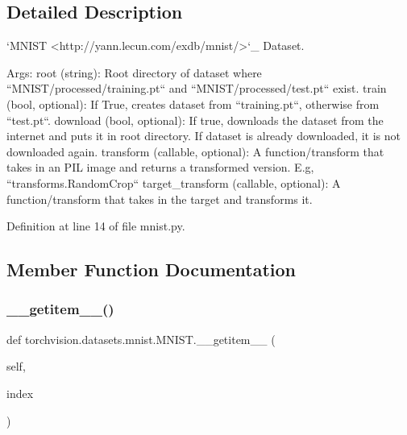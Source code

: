 \subsection{Detailed Description}
\begin{DoxyVerb}`MNIST <http://yann.lecun.com/exdb/mnist/>`_ Dataset.

Args:
    root (string): Root directory of dataset where ``MNIST/processed/training.pt``
        and  ``MNIST/processed/test.pt`` exist.
    train (bool, optional): If True, creates dataset from ``training.pt``,
        otherwise from ``test.pt``.
    download (bool, optional): If true, downloads the dataset from the internet and
        puts it in root directory. If dataset is already downloaded, it is not
        downloaded again.
    transform (callable, optional): A function/transform that  takes in an PIL image
        and returns a transformed version. E.g, ``transforms.RandomCrop``
    target_transform (callable, optional): A function/transform that takes in the
        target and transforms it.
\end{DoxyVerb}
 

Definition at line 14 of file mnist.\+py.



\subsection{Member Function Documentation}
\mbox{\label{classtorchvision_1_1datasets_1_1mnist_1_1MNIST_a96cf0fdd925579d66776beb24e1723f0}} 
\subsubsection{\texorpdfstring{\+\_\+\+\_\+getitem\+\_\+\+\_\+()}{\_\_getitem\_\_()}}
{\footnotesize\ttfamily def torchvision.\+datasets.\+mnist.\+M\+N\+I\+S\+T.\+\_\+\+\_\+getitem\+\_\+\+\_\+ (\begin{DoxyParamCaption}\item[{}]{self,  }\item[{}]{index }\end{DoxyParamCaption})}

